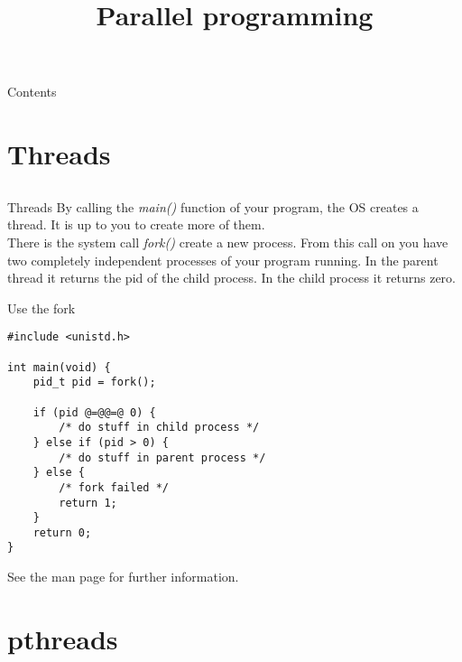 
\newcommand{\topic}{
	Parallel programming
}

\title{\topic}
\supertitle{\course}
\date{}



\maketitle

\begin{frame}{Contents}
	\tableofcontents
\end{frame}

\section{Threads}
\subsection{}
\begin{frame}{Threads}
    By calling the \textit{main()} function of your program, the OS creates a thread.
    It is up to you to create more of them.\\
    \bigskip
    There is the system call \textit{fork()} create a new process. From this call on you have two completely independent processes of your program running. In the parent thread it returns the pid of the child process. In the child process it returns zero.
    
\end{frame}
\begin{frame}[fragile]{Use the fork}
    \begin{lstlisting}
#include <unistd.h>

int main(void) {
    pid_t pid = fork();

    if (pid @=@@=@ 0) {
        /* do stuff in child process */
    } else if (pid > 0) {
        /* do stuff in parent process */
    } else {
        /* fork failed */
        return 1;
    }
    return 0;
}
\end{lstlisting}
    See the man page for further information.
\end{frame}

\section{pthreads}
